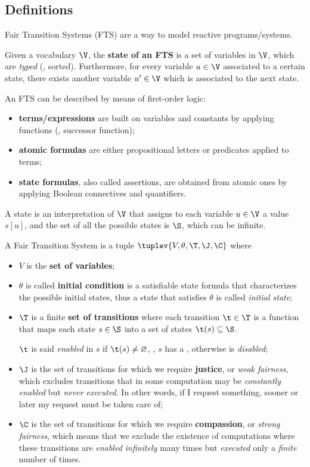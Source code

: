 \documentclass[oneside]{academica}
\begin{document}
\subsection{Definitions}

Fair Transition Systems (FTS) are a way to model reactive programs/systems.

Given a vocabulary $\V$, the \textbf{state of an FTS} is a set of variables in $\V$, which are \textit{typed} (\ie, sorted).
Furthermore, for every variable $u \in \V$ associated to a certain state, there exists another variable $u' \in \V$ which is associated to the next state.

An FTS can be described by means of first-order logic:
\begin{itemize}
  \item \textbf{terms/expressions} are built on variables and constants by applying functions (\eg, successor function);
  \item \textbf{atomic formulas} are either propositional letters or predicates applied to terms;
  \item \textbf{state formulas}, also called assertions, are obtained from atomic ones by applying Boolean connectives and quantifiers.
\end{itemize}
A state is an interpretation of $\V$ that assigns to each variable $u \in \V$ a value $s[u]$, and the set of all the possible states is $\S$, which can be infinite.

\begin{definition*}
  A Fair Transition System is a tuple $\tuplev{V, \theta, \T, \J, \C}$ where
  \begin{itemize}
    \item $V$ is the \textbf{set of variables};
    \item $\theta$ is called \textbf{initial condition} is a satisfiable state formula that characterizes the possible initial states, thus a state that satisfies $\theta$ is called \textit{initial state};
    \item $\T$ is a finite \textbf{set of transitions} where each transition $\t \in \T$ is a function that maps each state $s \in \S$ into a set of \tsuc states $\t(s) \subseteq \S$.

      $\t$ is said \textit{enabled} in $s$ if $\t(s) \neq \emptyset$, \ie, $s$ has a \tsuc, otherwise is \textit{disabled};
    \item $\J$ is the set of transitions for which we require \textbf{justice}, or \emph{weak fairness}, which excludes transitions that in some computation may be \textit{constantly enabled} but \textit{never executed}. In other words, if I request something, sooner or later my request must be taken care of;
  \item $\C$ is the set of transitions for which we require \textbf{compassion}, or \emph{strong fairness}, which means that we exclude the existence of computations where these transitions are \textit{enabled infinitely} many times but \textit{executed} only a \textit{finite} number of times.
  \end{itemize}
\end{definition*}
\end{document}
